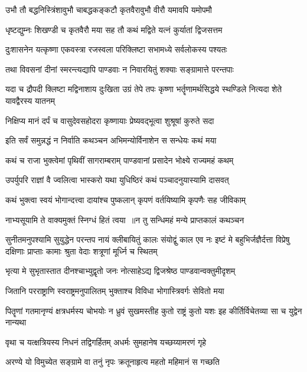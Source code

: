 \twolineshloka
{उभौ तौ बद्धनिस्त्रिंशावुभौ चाबद्धकङ्कटौ}
{कृतवैरावुभौ वीरौ यमावपि यमोपमौ}


\twolineshloka
{धृष्टद्युम्नः शिखण्डी च कृतवैरौ मया सह}
{तौ कथं मद्विते यत्नं कुर्यातां द्विजसत्तम}


\twolineshloka
{दुःशासनेन यत्कृष्णा एकवस्त्रा रजस्वला}
{परिक्लिष्टा सभामध्ये सर्वलोकस्य पश्यतः}


\twolineshloka
{तथा विवसनां दीनां स्मरन्त्यद्यापि पाण्डवाः}
{न निवारयितुं शक्याः सङ्ग्रामात्ते परन्तपाः}


\threelineshloka
{यदा च द्रौपदी क्लिष्टा मद्विनाशाय दुःखिता}
{उग्रं तेपे तपः कृष्णा भर्तॄणामर्थसिद्धये}
{स्थण्डिले नित्यदा शेते यावद्वैरस्य यातनम्}


\twolineshloka
{निक्षिप्य मानं दर्पं च वासुदेवसहोदरा}
{कृष्णायाः प्रेष्यवद्भूत्वा शुश्रूषां कुरुते सदा}


\twolineshloka
{इति सर्वं समुन्नद्धं न निर्वाति कथञ्चन}
{अभिमन्योर्विनाशेन स सन्धेयः कथं मया}


\twolineshloka
{कथं च राजा भुक्त्वेमां पृथिवीं सागराम्बराम्}
{पाण्डवानां प्रसादेन भोक्ष्ये राज्यमहं कथम्}


\twolineshloka
{उपर्युपरि राज्ञां वै ज्वलित्वा भास्करो यथा}
{युधिष्ठिरं कथं पञ्चादनुयास्यामि दासवत्}


\twolineshloka
{कथं भुक्त्वा स्वयं भोगान्दत्त्वा दायांश्च पुष्कलान्}
{कृपणं वर्तयिष्यामि कृपणैः सह जीविकाम्}


\twolineshloka
{नाभ्यसूयामि ते वाक्यमुक्तं स्निग्धं हितं त्वया ॥न तु सन्धिमहं मन्ये प्राप्तकालं कथञ्चन}
{}


सुनीतमनुपश्यामि सुयुद्धेन परन्तप
नायं क्लीबायितुं कालः संयोद्वुं काल एव नः
\twolineshloka
{इष्टं मे बहुभिर्जज्ञैर्दत्ता विप्रेषु दक्षिणाः}
{प्राप्ताः कामाः श्रुता वेदाः शत्रूणां मूर्ध्नि च स्थितम्}


\twolineshloka
{भृत्या मे सुभृतास्तात दीनश्चाभ्युद्वृतो जनः}
{नोत्साहेऽद्य द्विजश्रेष्ठ पाण्डवान्वक्तुमीदृशम्}


\twolineshloka
{जितानि परराष्ट्राणि स्वराष्ट्रमनुपालितम्}
{भुक्ताश्च विविधा भोगास्त्रिवर्गः सेवितो मया}


\threelineshloka
{पितॄणां गतमानृण्यं क्षत्रधर्मस्य चोभयोः}
{न ध्रुवं सुखमस्तीह कुतो राष्ट्रं कुतो यशः}
{इह कीर्तिर्विचेतव्या सा च युद्वेन नान्यथा}


\twolineshloka
{वृथा च यत्क्षत्रियस्य निधनं तद्विगर्हितम्}
{अधर्मः सुमहानेष यच्छय्यामरणं गृहे}


\twolineshloka
{अरण्ये यो विमुच्येत सङ्ग्रामे वा तनुं नृपः}
{क्रतूनाहृत्य महतो महिमानं स गच्छति}



